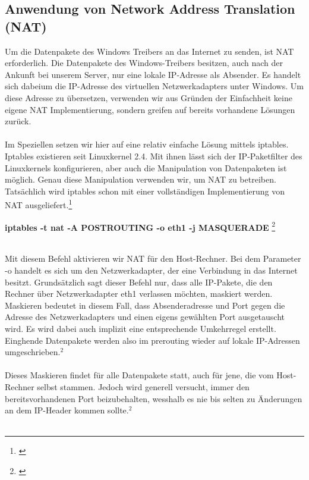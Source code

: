 \subsection{Anwendung von Network Address Translation (NAT)}
Um die Datenpakete des Windows Treibers an das Internet zu senden, ist NAT erforderlich. Die Datenpakete des Windows-Treibers besitzen, auch nach der Ankunft bei unserem Server, nur eine lokale IP-Adresse als Absender. Es handelt sich dabeium die IP-Adresse des virtuellen Netzwerkadapters unter Windows. Um diese Adresse zu übersetzen, verwenden wir aus Gründen der Einfachheit keine eigene NAT Implementierung, sondern greifen auf bereits vorhandene Lösungen zurück. 
\\\\ 
Im Speziellen setzen wir hier auf eine relativ einfache Lösung mittels iptables.
Iptables existieren seit Linuxkernel 2.4. Mit ihnen lässt sich der IP-Paketfilter des Linuxkernels konfigurieren, aber auch die Manipulation von Datenpaketen ist möglich. Genau diese Manipulation verwenden wir, um NAT zu betreiben. Tatsächlich wird iptables schon mit einer vollständigen Implementierung von NAT ausgeliefert.\footnote[1]{\cite[Vgl.][]{SRV19}}
\\ %
\begin{center}
    \textbf{iptables -t nat -A POSTROUTING -o eth1 -j MASQUERADE} \footnote[2]{\cite[Vgl.][]{SRV20}}
\end{center}
\ \\ 
Mit diesem Befehl aktivieren wir NAT für den Host-Rechner. Bei dem Parameter -o handelt es sich um den Netzwerkadapter, der eine Verbindung in das Internet besitzt. Grundsätzlich sagt dieser Befehl nur, dass alle IP-Pakete, die den Rechner über Netzwerkadapter eth1 verlassen möchten, maskiert werden. Maskieren bedeutet in diesem Fall, dass Absenderadresse und Port gegen die Adresse des Netzwerkadapters und einen eigens gewählten Port ausgetauscht wird. Es wird dabei auch implizit eine entsprechende Umkehrregel erstellt. Einghende Datenpakete werden also im prerouting wieder auf lokale IP-Adressen umgeschrieben.$^{2}$ %
\\\\
Dieses Maskieren findet für alle Datenpakete statt, auch für jene, die vom Host-Rechner selbst stammen. Jedoch wird generell versucht, immer den bereitsvorhandenen Port beizubehalten, wesshalb es nie bis selten zu Änderungen an dem IP-Header kommen sollte.$^{2}$
\\\\ 
